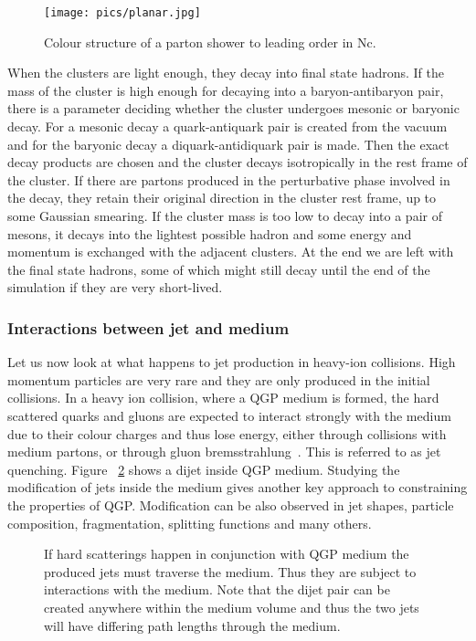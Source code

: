 \begin{figure}
\centering
\texttt{[image: pics/planar.jpg]}
\caption[]{ Colour structure of a parton shower to leading order in Nc.
\cite{eventGenerators} }
\label{fig:colourstructure}
\end{figure}

When the clusters are light enough, they decay into final state hadrons. If the mass of the cluster is high enough for decaying into a baryon-antibaryon pair, there is a parameter deciding whether the cluster undergoes mesonic or baryonic decay. For a mesonic decay a quark-antiquark pair is created from the vacuum and for the baryonic decay a diquark-antidiquark pair is made. Then the exact decay products are chosen and the cluster decays isotropically in the rest frame of the cluster. If there are partons produced in the perturbative phase involved in the decay, they retain their original direction in the cluster rest frame, up to some Gaussian smearing. If the cluster mass is too low to decay into a pair of mesons, it decays into the lightest possible hadron and some energy and momentum is exchanged with the adjacent clusters. At the end we are left with the final state hadrons, some of which might still decay until the end of the simulation if they are very short-lived.~\cite{missing} 

\subsubsection{Interactions between jet and medium}
Let us now look at what happens to jet production in heavy-ion collisions. High momentum particles are very rare and they are only produced in the initial collisions. In a heavy ion collision, where a QGP medium is formed, the hard scattered quarks and gluons are expected to interact strongly with the medium due to their colour charges and thus lose energy, either through collisions with medium partons, or through gluon bremsstrahlung~\cite{Connors:2017ptx}. This is referred to as jet quenching. Figure ~\ref{fig:jetq} shows a dijet inside QGP medium. Studying the modification of jets inside the medium gives another key approach to constraining the properties of QGP. Modification can be also observed in jet shapes, particle composition, fragmentation, splitting functions and many others.


\begin{figure}
\centering

\caption{If hard scatterings happen in conjunction with QGP medium the produced jets must traverse the medium. Thus they are subject to interactions with the medium. Note that the dijet pair can be created anywhere within the medium volume and thus the two jets will have differing path lengths through the medium.}
\label{fig:jetq}
\end{figure}

